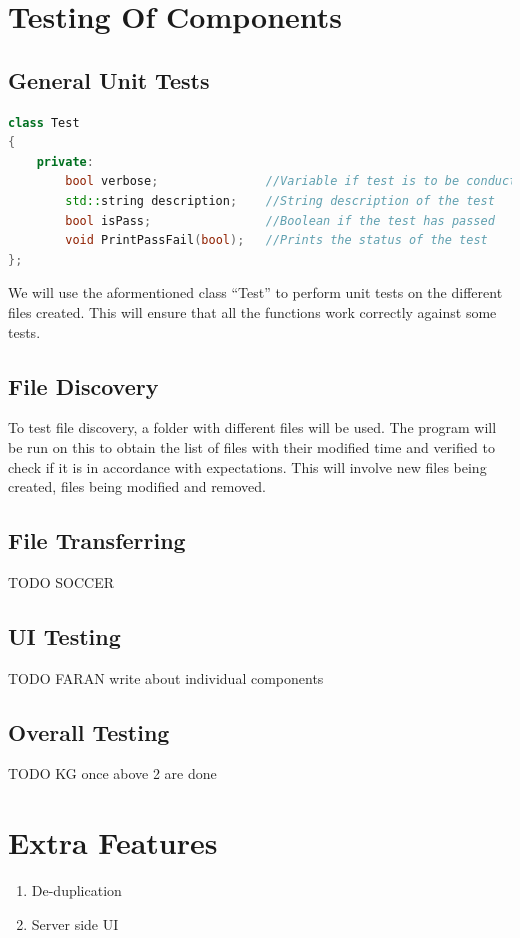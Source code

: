 \documentclass{article}
\begin{document}
	\section{Testing Of Components}
			\subsection{General Unit Tests}
				\newline
				\begin{lstlisting}[language=C++, caption={Class Parameters for Test}]
class Test
{
	private:
		bool verbose;               //Variable if test is to be conducted
		std::string description;    //String description of the test
		bool isPass;                //Boolean if the test has passed 
		void PrintPassFail(bool);   //Prints the status of the test
};
				\end{lstlisting}

				We will use the aformentioned class ``Test'' to perform unit tests on the different files created. This will ensure that all the functions work correctly against some tests.

			\subsection{File Discovery}
				\newline
				To test file discovery, a folder with different files will be used. The program will be run on this to obtain the list of files with their modified time and verified to check if it is in accordance with expectations. This will involve new files being created, files being modified and removed.
			\subsection{File Transferring}
				\newline
				TODO SOCCER
			\subsection{UI Testing}
				\newline
				TODO FARAN write about individual components
			\subsection{Overall Testing}
				\newline
				TODO KG once above 2 are done

	\section{Extra Features}
		\begin{enumerate}
			\item De-duplication
			\item Server side UI
		\end{enumerate}
\end{document}
